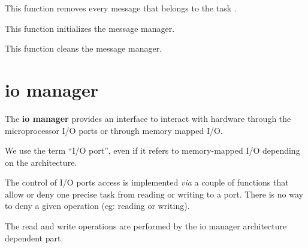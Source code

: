 	 {
	   This function removes every message that belongs to the task
	   .
	 }

	 {
	   This function initializes the message manager.
	 }

	 {
	   This function cleans the message manager.
	 }

%
%

\section{io manager}

The \textbf{io manager} provides an interface to interact with
hardware through the microprocessor I/O ports or through memory mapped
I/O.

We use the term ``I/O port'', even if it refers to memory-mapped I/O
depending on the architecture.

The control of I/O ports access is implemented \textit{via} a couple
of functions that allow or deny one precise task from reading or
writing to a port. There is no way to deny a given operation (eg:
reading or writing).

The read and write operations are performed by the io manager
architecture dependent part.

